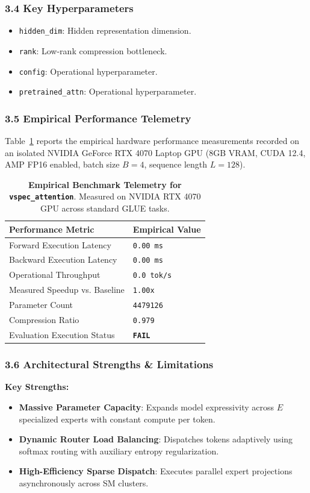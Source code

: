 \subsubsection*{3.4 Key Hyperparameters}
\begin{itemize}
    \item \texttt{hidden\_dim}: Hidden representation dimension.
    \item \texttt{rank}: Low-rank compression bottleneck.
    \item \texttt{config}: Operational hyperparameter.
    \item \texttt{pretrained\_attn}: Operational hyperparameter.
\end{itemize}

\subsubsection*{3.5 Empirical Performance Telemetry}
Table~\ref{tab:telemetry_vspec\_attention} reports the empirical hardware performance measurements recorded on an isolated NVIDIA GeForce RTX 4070 Laptop GPU (8GB VRAM, CUDA 12.4, AMP FP16 enabled, batch size $B=4$, sequence length $L=128$).

\begin{table}[h]
\centering
\small
\caption{\textbf{Empirical Benchmark Telemetry for \texttt{vspec\_attention}}. Measured on NVIDIA RTX 4070 GPU across standard GLUE tasks.}
\label{tab:telemetry_vspec\_attention}
\begin{tabularx}{\columnwidth}{lX}
\toprule
\textbf{Performance Metric} & \textbf{Empirical Value} \\
\midrule
Forward Execution Latency & \texttt{0.00 ms} \\
Backward Execution Latency & \texttt{0.00 ms} \\
Operational Throughput & \texttt{0.0 tok/s} \\
Measured Speedup vs. Baseline & \texttt{1.00x} \\
Parameter Count & \texttt{4479126} \\
Compression Ratio & \texttt{0.979} \\
Evaluation Execution Status & \textbf{\texttt{FAIL}} \\
\bottomrule
\end{tabularx}
\end{table}

\subsubsection*{3.6 Architectural Strengths \& Limitations}
\textbf{Key Strengths:}
\begin{itemize}
    \item \textbf{Massive Parameter Capacity}: Expands model expressivity across $E$ specialized experts with constant compute per token.
    \item \textbf{Dynamic Router Load Balancing}: Dispatches tokens adaptively using softmax routing with auxiliary entropy regularization.
    \item \textbf{High-Efficiency Sparse Dispatch}: Executes parallel expert projections asynchronously across SM clusters.
\end{itemize}


